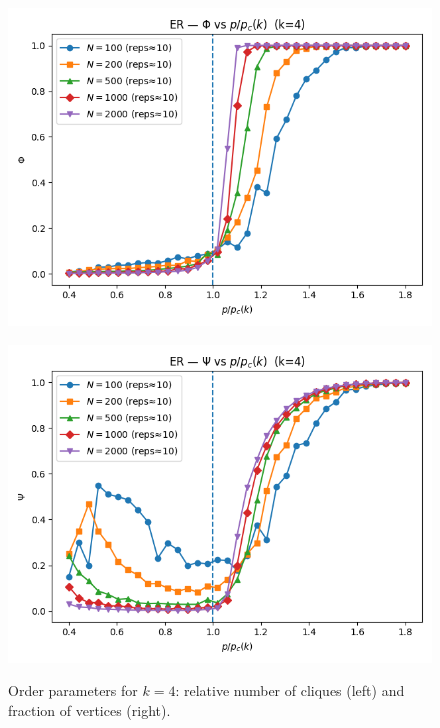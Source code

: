 \begin{figure}[h!]
    \centering
    \setlength{\tabcolsep}{2pt}
    \begin{minipage}[t]{0.48\textwidth}
        \centering
        \includegraphics[width=\textwidth]{images/IMAGES TASK2/ER_phi_k4.png}
        \label{fig:phi_k4}
    \end{minipage}
    \hfill
    \begin{minipage}[t]{0.48\textwidth}
        \centering
        \includegraphics[width=\textwidth]{images/IMAGES TASK2/ER_psi_k4.png}
        \label{fig:psi_k4}
    \end{minipage}
    \caption{Order parameters for $k=4$: relative number of cliques (left) and fraction of vertices (right).}
    \label{fig:orderparam_k4}
\end{figure}\\
